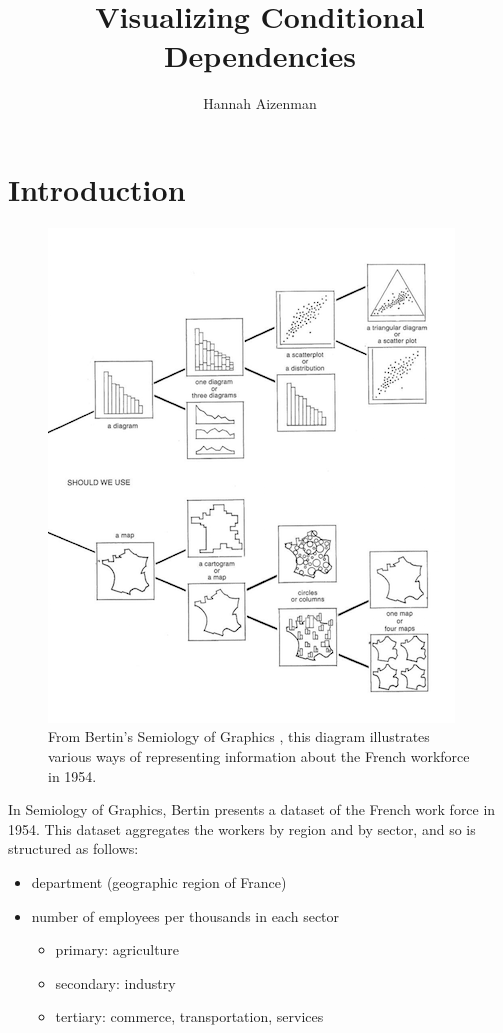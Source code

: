 \documentclass[letterpaper,onecolumn,titlepage]{Ythesis}
\title{Visualizing Conditional Dependencies}
\author{Hannah Aizenman}
\begin{document}
\makefrontmatter

\section{Introduction}
\label{sec:introduction}

\begin{figure}
  \includegraphics[width=\textwidth]{chart_chooser.png}
  \caption{From Bertin's Semiology of Graphics \cite{bertin_semiology_2011}, this diagram illustrates various ways of representing information about the French workforce in 1954.}
  \label{fig:chart_chooser}
\end{figure}

In Semiology of Graphics, Bertin \cite{bertin_semiology_2011} presents a dataset of the French work force in 1954. This dataset aggregates the workers by region and by sector, and so is structured as follows:
\begin{itemize}
	\item department (geographic region of France)
	\item  number of employees per thousands in each sector
		\begin{itemize}
			\item primary: agriculture
			\item secondary: industry 
			\item tertiary: commerce, transportation, services
		\end{itemize}
\end{itemize}
\end{document}
